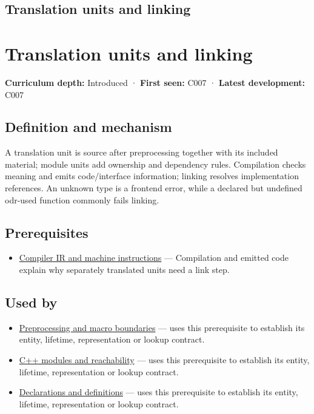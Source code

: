 \hypertarget{appendix-806686359e1b}{}
\section*{Translation units and linking}
\chapter{Translation units and linking}\label{appendix-806686359e1b-translation-units-and-linking}

\textbf{Curriculum depth:} Introduced · \textbf{First seen:} C007 · \textbf{Latest development:} C007

\section{Definition and mechanism}\label{appendix-806686359e1b-definition-and-mechanism}

A translation unit is source after preprocessing together with its included material; module units add ownership and dependency rules. Compilation checks meaning and emits code/interface information; linking resolves implementation references. An unknown type is a frontend error, while a declared but undefined odr-used function commonly fails linking.

\section{Prerequisites}\label{appendix-806686359e1b-prerequisites}

\begin{itemize}
\tightlist
\item
  \hyperref[appendix-942ad41afb30]{Compiler IR and machine instructions} --- Compilation and emitted code explain why separately translated units need a link step.
\end{itemize}

\section{Used by}\label{appendix-806686359e1b-used-by}

\begin{itemize}
\item
  \hyperref[appendix-33c0a92ce855]{Preprocessing and macro boundaries} --- uses this prerequisite to establish its entity, lifetime, representation or lookup contract.
\item
  \hyperref[appendix-410a611a5b8d]{C++ modules and reachability} --- uses this prerequisite to establish its entity, lifetime, representation or lookup contract.
\item
  \hyperref[appendix-2e4d494c2d94]{Declarations and definitions} --- uses this prerequisite to establish its entity, lifetime, representation or lookup contract.
\end{itemize}

